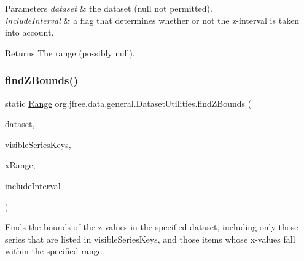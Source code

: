 \begin{DoxyParams}{Parameters}
{\em dataset} & the dataset ({\ttfamily null} not permitted). \\
\hline
{\em include\+Interval} & a flag that determines whether or not the z-\/interval is taken into account.\\
\hline
\end{DoxyParams}
\begin{DoxyReturn}{Returns}
The range (possibly {\ttfamily null}). 
\end{DoxyReturn}
\mbox{\label{classorg_1_1jfree_1_1data_1_1general_1_1_dataset_utilities_afa93d889086fc83c3fc9c32546486ea0}} 
\subsubsection{\texorpdfstring{find\+Z\+Bounds()}{findZBounds()}\hspace{0.1cm}{\footnotesize\ttfamily [3/3]}}
{\footnotesize\ttfamily static \mbox{\hyperlink{classorg_1_1jfree_1_1data_1_1_range}{Range}} org.\+jfree.\+data.\+general.\+Dataset\+Utilities.\+find\+Z\+Bounds (\begin{DoxyParamCaption}\item[{\mbox{\hyperlink{interfaceorg_1_1jfree_1_1data_1_1xy_1_1_x_y_z_dataset}{X\+Y\+Z\+Dataset}}}]{dataset,  }\item[{List}]{visible\+Series\+Keys,  }\item[{\mbox{\hyperlink{classorg_1_1jfree_1_1data_1_1_range}{Range}}}]{x\+Range,  }\item[{boolean}]{include\+Interval }\end{DoxyParamCaption})\hspace{0.3cm}{\ttfamily [static]}}

Finds the bounds of the z-\/values in the specified dataset, including only those series that are listed in visible\+Series\+Keys, and those items whose x-\/values fall within the specified range.


